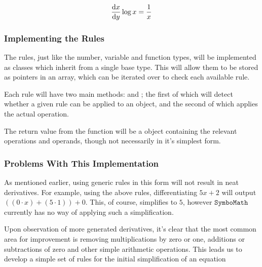 \documentclass[12pt]{article}
\def\Symbo{{$\texttt{SymboMath}$}}
\begin{document}
\begin{equation}
\dv{x}{y}\log{x} = \frac{1}{x}
\end{equation}
\fi

\iffalse
\begin{align*}
\dv{x}(f(x) \pm h(x)) &= \dv{f}{x} \pm \dv{h}{x}
\\
\\
\dv{x}{y}f(x)h(x) &= v \dv{h}{x} - u \dv{f}{x}
\\
\\
\dv{x}{y}\frac{f(x)}{h(x)} &= \frac{v \dv{u}{x} - u \dv{v}{x}}{v^2}
\end{align*}
\fi

\subsubsection{Implementing the Rules}

The rules, just like the number, variable and function types, will be implemented as classes which inherit from a single base type. This will allow them to be stored as pointers in an array, which can be iterated over to check each available rule.

Each rule will have two main methods:  and ; the first of which will detect whether a given rule can be applied to an object, and the second of which applies the actual operation.

The return value from the  function will be a  object containing the relevant operations and operands, though not necessarily in it's simplest form.

\subsubsection{Problems With This Implementation}

As mentioned earlier, using generic rules in this form will not result in neat derivatives. For example, using the above rules, differentiating $5x + 2$ will output $((0 \cdot x) + (5 \cdot 1)) + 0$. This, of course, simplifies to $5$, however \Symbo{} currently has no way of applying such a simplification.

Upon observation of more generated derivatives, it's clear that the most common area for improvement is removing multiplications by zero or one, additions or subtractions of zero and other simple arithmetic operations. This leads us to develop a simple set of rules for the initial simplification of an equation
\end{document}
